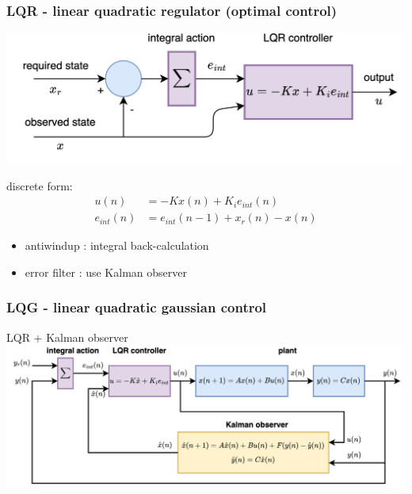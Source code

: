 \documentclass{beamer}
\begin{document}
\begin{frame}
  \frametitle{\bf LQR - linear quadratic regulator (optimal control)}

  {\centering \includegraphics[scale=0.8]{../diagrams/controll/control-lqr_disc.png}}

  discrete form: 
  \begin{align*}
    u(n) &= -Kx(n) + K_ie_{int}(n) \\
    e_{int}(n)&= e_{int}(n-1) + x_r(n) - x(n)
  \end{align*}
  
  \begin{itemize}
    \item antiwindup   : integral back-calculation
    \item error filter : use Kalman observer
  \end{itemize}

\end{frame}



\begin{frame}
  \frametitle{\bf LQG - linear quadratic gaussian control}
  LQR + Kalman observer
  {\centering \includegraphics[scale=0.6]{../diagrams/controll/control-lqg_discrete.png}}

\end{frame}
\end{document}
